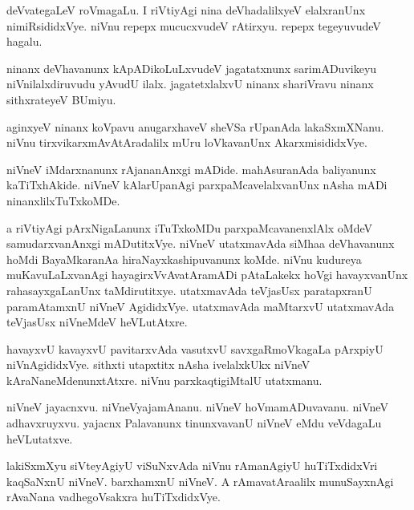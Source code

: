 \documentclass{article}
\begin{document}
\begin{mn}%
deVvategaLeV roVmagaLu. I riVtiyAgi nina deVhadalilxyeV elalxranUnx nimiRsididxVye. niVnu repepx 
mucucxvudeV rAtirxyu. repepx tegeyuvudeV hagalu.
\end{mn}

\begin{mn}%
ninanx deVhavanunx kApADikoLuLxvudeV jagatatxnunx sarimADuvikeyu niVnilalxdiruvudu yAvudU ilalx. 
jagatetxlalxvU ninanx shariVravu ninanx sithxrateyeV BUmiyu.
\end{mn}

\begin{mn}%
aginxyeV ninanx koVpavu anugarxhaveV sheVSa rUpanAda lakaSxmXNanu. niVnu tirxvikarxmAvAtAradalilx 
mUru loVkavanUnx AkarxmisididxVye.
\end{mn}

\begin{mn}%
niVneV iMdarxnanunx rAjananAnxgi mADide. mahAsuranAda baliyanunx kaTiTxhAkide. niVneV kAlarUpanAgi 
parxpaMcavelalxvanUnx nAsha mADi ninanxlilxTuTxkoMDe.
\end{mn}

\begin{mn}%
a riVtiyAgi pArxNigaLanunx iTuTxkoMDu parxpaMcavanenxlAlx oMdeV samudarxvanAnxgi mADutitxVye. 
niVneV utatxmavAda siMhaa deVhavanunx hoMdi BayaMkaranAa hiraNayxkashipuvanunx koMde. niVnu 
kudureya muKavuLaLxvanAgi hayagirxVvAvatAramADi pAtaLakekx hoVgi havayxvanUnx rahasayxgaLanUnx 
taMdirutitxye. utatxmavAda teVjasUsx paratapxranU paramAtamxnU niVneV AgididxVye. utatxmavAda 
maMtarxvU utatxmavAda teVjasUsx niVneMdeV heVLutAtxre.
\end{mn}

\begin{mn}%
havayxvU kavayxvU pavitarxvAda vasutxvU savxgaRmoVkagaLa pArxpiyU niVnAgididxVye. sithxti utapxtitx 
nAsha ivelalxkUkx niVneV kAraNaneMdenunxtAtxre. niVnu parxkaqtigiMtalU utatxmanu.
\end{mn}

\begin{mn}%
niVneV jayacnxvu. niVneVyajamAnanu. niVneV hoVmamADuvavanu. niVneV adhavxruyxvu. yajacnx Palavanunx 
tinunxvavanU niVneV eMdu veVdagaLu heVLutatxve.
\end{mn}

\begin{mn}%
lakiSxmXyu siVteyAgiyU viSuNxvAda niVnu rAmanAgiyU huTiTxdidxVri kaqSaNxnU niVneV. barxhamxnU 
niVneV. A rAmavatAraalilx munuSayxnAgi rAvaNana vadhegoVsakxra huTiTxdidxVye.
\end{mn}
\end{document}
